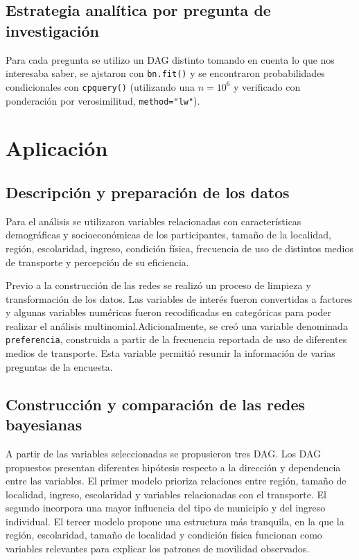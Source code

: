 \documentclass[
  letterpaper,
  DIV=11,
  numbers=noendperiod]{scrartcl}
\begin{document}
\subsection{Estrategia analítica por pregunta de investigación}
Para cada pregunta se utilizo un DAG distinto tomando en cuenta lo que nos interesaba saber, se ajstaron con \texttt{bn.fit()} y se encontraron probabilidades condicionales con \texttt{cpquery()} (utilizando una \(n=10^{6}\) y verificado con ponderación por
verosimilitud, \texttt{method="lw"}).



\section{Aplicación}\label{Aplicación}

\subsection{Descripción y preparación de los datos}

Para el análisis se utilizaron variables relacionadas 
con características demográficas y socioeconómicas de los participantes, tamaño de 
la localidad, región, escolaridad, ingreso, condición física, frecuencia de uso de 
distintos medios de transporte y percepción de su eficiencia.

Previo a la construcción de las redes se realizó un proceso de limpieza y 
transformación de los datos. Las variables de interés fueron convertidas a factores y 
algunas variables numéricas fueron recodificadas en categóricas para poder 
realizar el análisis multinomial.Adicionalmente, se creó una variable denominada 
\texttt{preferencia}, construida 
a partir de la frecuencia reportada de uso de diferentes medios de transporte. 
Esta variable permitió resumir la información de varias preguntas de la encuesta.

\subsection{Construcción y comparación de las redes bayesianas}

A partir de las variables seleccionadas se propusieron tres DAG.  
Los DAG propuestos presentan diferentes hipótesis respecto a la dirección y 
dependencia entre las variables. El primer modelo prioriza relaciones entre región, 
tamaño de localidad, ingreso, escolaridad y variables relacionadas con el transporte. 
El segundo incorpora una mayor influencia del tipo de municipio y del ingreso 
individual. El tercer modelo propone una estructura más tranquila, en la que 
la región, escolaridad, tamaño de localidad y condición física funcionan como 
variables relevantes para explicar los patrones de movilidad observados.
\end{document}
